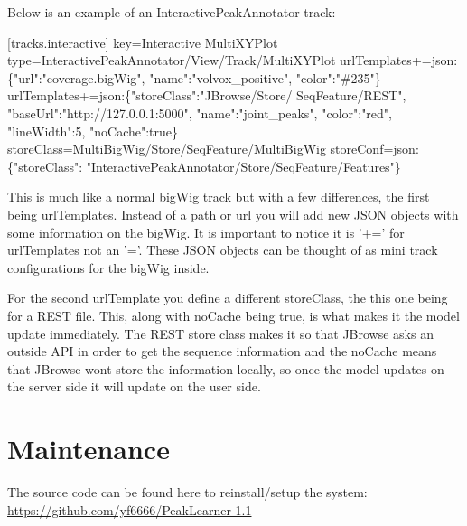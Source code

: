 \documentclass[a4paper,12pt]{article}
\newenvironment{monospace}{\fontfamily{pcr}\selectfont}{\par}
\begin{document}
Below is an example of an InteractivePeakAnnotator track: \linebreak

\begin{monospace}

\raggedright [tracks.interactive] \linebreak
key=Interactive MultiXYPlot \linebreak
type=InteractivePeakAnnotator/View/Track/MultiXYPlot \linebreak
urlTemplates+=json:\{"url":"coverage.bigWig", "name":"volvox\_positive", "color":"\#235"\} \linebreak
urlTemplates+=json:\{"storeClass":"JBrowse/Store/ SeqFeature/REST", "baseUrl":"http://127.0.0.1:5000", "name":"joint\_peaks", "color":"red", "lineWidth":5, "noCache":true\} \linebreak
storeClass=MultiBigWig/Store/SeqFeature/MultiBigWig \linebreak
storeConf=json:\{"storeClass": "InteractivePeakAnnotator/Store/SeqFeature/Features"\} \linebreak

\end{monospace}

This is much like a normal bigWig track but with a few differences, the first being urlTemplates. Instead of a path or url you will add new JSON objects with some information on the bigWig. It is important to notice it is '+=' for urlTemplates not an '='. These JSON objects can be thought of as mini track configurations for the bigWig inside. \par

For the second urlTemplate you define a different storeClass, the this one being for a REST file. This, along with noCache being true, is what makes it the model update immediately. The REST store class makes it so that JBrowse asks an outside API in order to get the sequence information and the noCache means that JBrowse wont store the information locally, so once the model updates on the server side it will update on the user side.

\section{Maintenance}

The source code can be found here to reinstall/setup the system: \linebreak \url{https://github.com/yf6666/PeakLearner-1.1} \par
\end{document}
